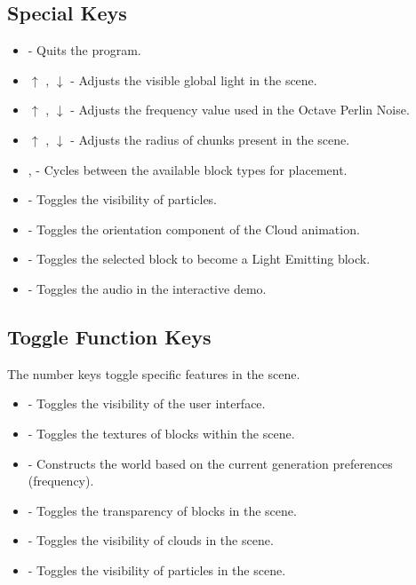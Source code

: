\documentclass[a4paper,11pt,titlepage]{scrartcl}
\begin{document}
\subsection{Special Keys}
\begin{itemize}
	\item {} - Quits the program. 
	\item $\uparrow$ , $\downarrow$  - Adjusts the visible global light in the scene.
	\item $\uparrow$ , $\downarrow$  - Adjusts the frequency value used in the Octave Perlin Noise.
	\item $\uparrow$ , $\downarrow$  - Adjusts the radius of chunks present in the scene.
	\item {},  - Cycles between the available block types for placement.
	\item {} - Toggles the visibility of particles.
	\item {} - Toggles the orientation component of the Cloud animation.
	\item {} - Toggles the selected block to become a Light Emitting block.
	\item {} - Toggles the audio in the interactive demo.
\end{itemize}
      
\subsection{Toggle Function Keys}
The number keys toggle specific features in the scene.
\begin{itemize}
	\item {} - Toggles the visibility of the user interface.
	\item {} - Toggles the textures of blocks within the scene.
	\item {} - Constructs the world based on the current generation preferences (frequency).
	\item {} - Toggles the transparency of blocks in the scene.
	\item {} - Toggles the visibility of clouds in the scene.
	\item {} - Toggles the visibility of particles in the scene.
\end{itemize}

\end{document}
